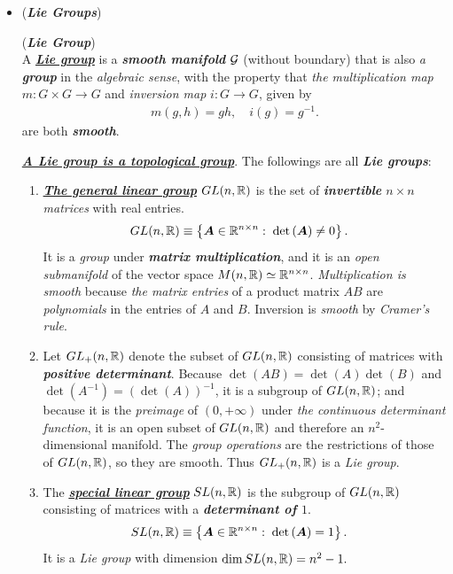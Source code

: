 \documentclass[11pt]{article}
\begin{document}
\begin{itemize}
\item \begin{example} (\emph{\textbf{Lie Groups}})
\begin{definition} (\emph{\textbf{Lie Group}}) \citep{lee2003introduction}\\
A \underline{\emph{\textbf{Lie group}}} is a \emph{\textbf{smooth manifold}} ${\mathcal G}$ (without boundary) that is also \emph{a \textbf{group}} in the
\emph{algebraic sense}, with the property that \emph{the multiplication map} $m: G \times G \rightarrow G$ and \emph{inversion map} $i: G \rightarrow G$, given by
\begin{align*}
m(g, h) = g h, \quad i(g) = g^{-1}.
\end{align*} are both \emph{\textbf{smooth}}. 
\end{definition}
\underline{\emph{\textbf{A Lie group is a topological group}}}. The followings are all \emph{\textbf{Lie groups}}:
\begin{enumerate}
\item \underline{\emph{\textbf{The general linear group}}} $GL(n, {\mathbb R})$ is the set of \emph{\textbf{invertible} $n\times n$ matrices} with real entries.
\begin{align*}
GL(n, {\mathbb R}) &\equiv \left\{\boldsymbol{A}\in {\mathbb R}^{n\times n}:\; \det\left(\boldsymbol{A}\right)\neq 0\right\}. 
\end{align*}
It is a \emph{group} under \emph{\textbf{matrix multiplication}}, and it is an \emph{open submanifold} of the vector space $M(n, {\mathbb R}) \simeq {\mathbb R}^{n \times n}$. \emph{Multiplication is smooth} because \emph{the matrix entries} of a product matrix $AB$ are \emph{polynomials} in the entries of $A$ and $B$. Inversion is \emph{smooth} by \emph{Cramer's rule}.

\item Let $GL_{+}(n, {\mathbb R})$  denote the subset of $GL(n, {\mathbb R})$ consisting of matrices with \emph{\textbf{positive determinant}}. Because $\det(AB) =\det(A)\det(B)$ and $\det(A^{-1})= (\det(A))^{-1}$, it is a subgroup of $GL(n, {\mathbb R})$; and because it is the \emph{preimage} of $(0, +\infty)$ under \emph{the continuous determinant function}, it is an open subset of $GL(n, {\mathbb R})$ and therefore an $n^2$-dimensional manifold. The \emph{group operations} are the restrictions of those of $GL(n, {\mathbb R})$, so they are smooth. Thus  $GL_{+}(n, {\mathbb R})$ is a \emph{Lie group}.

\item The \underline{\emph{\textbf{special linear group}}} $SL(n, {\mathbb R})$ is the subgroup of $GL(n, {\mathbb R})$ consisting of matrices with a \emph{\textbf{determinant of $1$}}.
\begin{align*}
SL(n, {\mathbb R}) &\equiv \left\{\boldsymbol{A}\in {\mathbb R}^{n\times n}:\; \det\left(\boldsymbol{A}\right)= 1\right\}. 
\end{align*}
It is a \emph{Lie group} with dimension $\dim{SL(n,{\mathbb R})} = n^{2} - 1.$ 


\end{enumerate}
\end{example}
\end{itemize}
\end{document}
